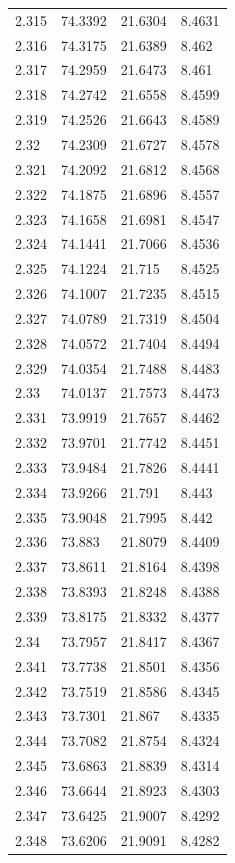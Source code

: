 \begin{tabular}{llll}
2.315 & 74.3392 & 21.6304 & 8.4631 \\
2.316 & 74.3175 & 21.6389 & 8.462 \\
2.317 & 74.2959 & 21.6473 & 8.461 \\
2.318 & 74.2742 & 21.6558 & 8.4599 \\
2.319 & 74.2526 & 21.6643 & 8.4589 \\
2.32 & 74.2309 & 21.6727 & 8.4578 \\
2.321 & 74.2092 & 21.6812 & 8.4568 \\
2.322 & 74.1875 & 21.6896 & 8.4557 \\
2.323 & 74.1658 & 21.6981 & 8.4547 \\
2.324 & 74.1441 & 21.7066 & 8.4536 \\
2.325 & 74.1224 & 21.715 & 8.4525 \\
2.326 & 74.1007 & 21.7235 & 8.4515 \\
2.327 & 74.0789 & 21.7319 & 8.4504 \\
2.328 & 74.0572 & 21.7404 & 8.4494 \\
2.329 & 74.0354 & 21.7488 & 8.4483 \\
2.33 & 74.0137 & 21.7573 & 8.4473 \\
2.331 & 73.9919 & 21.7657 & 8.4462 \\
2.332 & 73.9701 & 21.7742 & 8.4451 \\
2.333 & 73.9484 & 21.7826 & 8.4441 \\
2.334 & 73.9266 & 21.791 & 8.443 \\
2.335 & 73.9048 & 21.7995 & 8.442 \\
2.336 & 73.883 & 21.8079 & 8.4409 \\
2.337 & 73.8611 & 21.8164 & 8.4398 \\
2.338 & 73.8393 & 21.8248 & 8.4388 \\
2.339 & 73.8175 & 21.8332 & 8.4377 \\
2.34 & 73.7957 & 21.8417 & 8.4367 \\
2.341 & 73.7738 & 21.8501 & 8.4356 \\
2.342 & 73.7519 & 21.8586 & 8.4345 \\
2.343 & 73.7301 & 21.867 & 8.4335 \\
2.344 & 73.7082 & 21.8754 & 8.4324 \\
2.345 & 73.6863 & 21.8839 & 8.4314 \\
2.346 & 73.6644 & 21.8923 & 8.4303 \\
2.347 & 73.6425 & 21.9007 & 8.4292 \\
2.348 & 73.6206 & 21.9091 & 8.4282 \\

\end{tabular}
